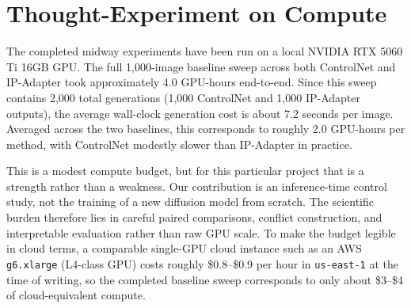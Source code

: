 \documentclass[twocolumn,11pt]{article}
\begin{document}
\begin{table}[h]
\centering
\caption{Final-stage ablation plan. This table makes the remaining experiments more explicit than a single high-level comparison table.}
\label{tab:ablation_plan}
\setlength{\tabcolsep}{3pt}
\small
{}
\end{table}

\section{Thought-Experiment on Compute}
The completed midway experiments have been run on a local NVIDIA RTX 5060 Ti 16GB GPU. The full 1{,}000-image baseline sweep across both ControlNet and IP-Adapter took approximately 4.0 GPU-hours end-to-end. Since this sweep contains 2{,}000 total generations (1{,}000 ControlNet and 1{,}000 IP-Adapter outputs), the average wall-clock generation cost is about 7.2 seconds per image. Averaged across the two baselines, this corresponds to roughly 2.0 GPU-hours per method, with ControlNet modestly slower than IP-Adapter in practice.

This is a modest compute budget, but for this particular project that is a strength rather than a weakness. Our contribution is an inference-time control study, not the training of a new diffusion model from scratch. The scientific burden therefore lies in careful paired comparisons, conflict construction, and interpretable evaluation rather than raw GPU scale. To make the budget legible in cloud terms, a comparable single-GPU cloud instance such as an AWS \texttt{g6.xlarge} (L4-class GPU) costs roughly \$0.8--\$0.9 per hour in \texttt{us-east-1} at the time of writing, so the completed baseline sweep corresponds to only about \$3--\$4 of cloud-equivalent compute.
\end{document}
